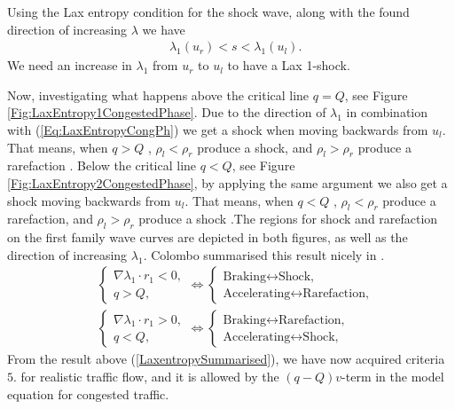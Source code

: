 \documentclass[10pt]{article}
\numberwithin{equation}{section}
\begin{document}
Using the Lax entropy condition for the shock wave, along with the found direction of increasing $\lambda$ we have \begin{align}
   &  \lambda_1 (u_r) < s < \lambda_1 (u_l).
   \label{Eq:LaxEntropyCongPh}
\end{align} We need an increase in $\lambda_1 $ from $u_r$ to $u_l$ to have a Lax 1-shock.

\begin{figure}
    \centering
    
\end{figure}

Now, investigating what happens above the critical line $ q = Q$, see Figure \ref{Fig:LaxEntropy1CongestedPhase}. Due to the direction of $\lambda_1$ in combination with (\ref{Eq:LaxEntropyCongPh}) we get a shock when moving backwards from $u_l$. That means, when $q > Q$ , $\rho_l < \rho_r$ produce a shock, and $\rho_l > \rho_r$ produce a rarefaction . Below the critical line $q < Q$, see Figure \ref{Fig:LaxEntropy2CongestedPhase}, by applying the same argument we also get a shock moving backwards from $u_l$. That means, when $q < Q$ , $\rho_l < \rho_r$ produce a rarefaction, and $\rho_l > \rho_r$ produce a shock .The regions for shock and rarefaction on the first family wave curves are depicted in both figures, as well as the direction of increasing $\lambda_1$. Colombo summarised this result nicely in \cite{Colombo2002}.
\begin{equation}
\begin{aligned}
   & \begin{cases}
    \nabla \lambda_1 \cdot r_1 < 0 , \\
    q > Q ,
    \end{cases} \iff \begin{cases}
    \text{Braking} \leftrightarrow \text{Shock,} \\
    \text{Accelerating} \leftrightarrow \text{Rarefaction,} 
    \end{cases}  \\
   &\begin{cases}
    \nabla \lambda_1 \cdot r_1 > 0 , \\
    q < Q ,
    \end{cases} \iff \begin{cases}
    \text{Braking} \leftrightarrow \text{Rarefaction,} \\
    \text{Accelerating} \leftrightarrow \text{Shock,} 
    \end{cases}
    \label{LaxentropySummarised}
\end{aligned} \end{equation} From the result above (\ref{LaxentropySummarised}), we have now acquired criteria $5.$ for realistic traffic flow, and it is allowed by the $(q-Q)v$-term in the model equation for congested traffic. 
\end{document}
